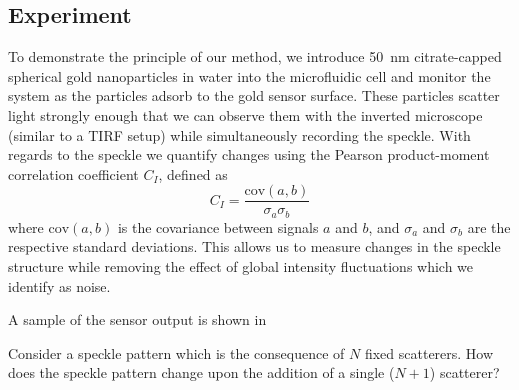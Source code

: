 \subsection{Experiment}
To demonstrate the principle of our method, we introduce
\SI{50}{\nano\meter} citrate-capped spherical gold nanoparticles in water
into the microfluidic cell and monitor the system as the particles adsorb
to the gold sensor surface.  These particles scatter light strongly enough
that we can observe them with the inverted microscope (similar to a TIRF
setup) while simultaneously recording the speckle.  With regards to the
speckle we quantify changes using the Pearson product-moment
correlation coefficient $C_I$, defined as 
\begin{equation}
C_I = \frac{\mathrm{cov}(a,b)}{\sigma_a \sigma_b}
\end{equation}
where $\mathrm{cov}(a,b)$ is the covariance between signals $a$ and $b$,
and $\sigma_a$ and $\sigma_b$ are the respective standard deviations.  This
allows us to measure changes in the speckle structure while removing the
effect of global intensity fluctuations which we identify as noise.

A sample of the sensor output is shown in 

Consider a speckle pattern which is the consequence of $N$ fixed
scatterers.  How does the speckle pattern change upon the addition of a
single ($N+1$) scatterer?  



